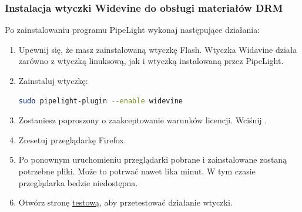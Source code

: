 \subsubsection{Instalacja wtyczki Widevine do obsługi materiałów DRM}
\noindent Po zainstalowaniu programu PipeLight wykonaj następujące działania:
\begin{enumerate}
\item Upewnij się, że masz zainstalowaną wtyczkę Flash. Wtyczka Widavine działa zarówno z wtyczką linuksową, jak i wtyczką instalowaną przez PipeLight.
\item Zainstaluj wtyczkę:
\begin{lstlisting}[language=bash]
sudo pipelight-plugin --enable widevine
\end{lstlisting}
\item Zostaniesz poproszony o zaakceptowanie warunków licencji. Wciśnij .
\item Zresetuj przeglądarkę Firefox.
\item Po ponownym uruchomieniu przeglądarki pobrane i zainstalowane zostaną potrzebne pliki. Może to potrwać nawet lika minut. W tym czasie przeglądarka bedzie niedostępna.
\item Otwórz stronę \href{http://www.widevine.com/demo/index.html}{testową}, aby przetestować działanie wtyczki.
\end{enumerate}

